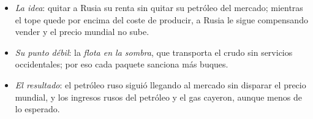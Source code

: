 \documentclass[11pt]{article}
\begin{document}
\begin{itemize}
  \begin{itemize}
  \item \emph{La idea}: quitar a Rusia su renta sin quitar su petróleo del mercado; mientras el tope quede por encima del coste de producir, a Rusia le sigue compensando vender y el precio mundial no sube.
  \item \emph{Su punto débil}: la \emph{flota en la sombra}, que transporta el crudo sin servicios occidentales; por eso cada paquete sanciona más buques.
  \item \emph{El resultado}: el petróleo ruso siguió llegando al mercado sin disparar el precio mundial, y los ingresos rusos del petróleo y el gas cayeron, aunque menos de lo esperado.
  \end{itemize}
\end{itemize}
\end{document}
